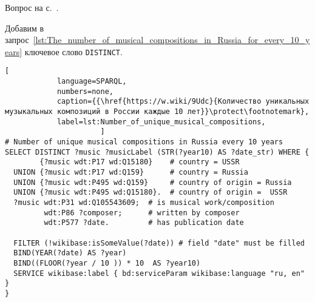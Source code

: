 \newpage
\begin{task}
    \AnswerBackref Вопрос на с.~\pageref{question:music_unique}.
    \label{answer:music_unique_answ}

    Добавим в запрос~\ref{lst:The_number_of_musical_compositions_in_Russia_for_every_10_years} ключевое слово \lstinline|DISTINCT|.
    \begin{lstlisting}[ 
            language=SPARQL, 
            numbers=none, 
            caption={{\href{https://w.wiki/9Udc}{Количество уникальных музыкальных композиций в России каждые 10 лет}}\protect\footnotemark}, 
            label=lst:Number_of_unique_musical_compositions, 
                      ]
# Number of unique musical compositions in Russia every 10 years
SELECT DISTINCT ?music ?musicLabel (STR(?year10) AS ?date_str) WHERE {
        {?music wdt:P17 wd:Q15180}    # country = USSR
  UNION {?music wdt:P17 wd:Q159}      # country = Russia
  UNION {?music wdt:P495 wd:Q159}     # country of origin = Russia
  UNION {?music wdt:P495 wd:Q15180}.  # country of origin =  USSR
  ?music wdt:P31 wd:Q105543609;  # is musical work/composition
         wdt:P86 ?composer;      # written by composer
         wdt:P577 ?date.         # has publication date

  FILTER (!wikibase:isSomeValue(?date)) # field "date" must be filled
  BIND(YEAR(?date) AS ?year)
  BIND((FLOOR(?year / 10 )) * 10  AS ?year10)
  SERVICE wikibase:label { bd:serviceParam wikibase:language "ru, en" }
}
\end{lstlisting}
\end{task}



